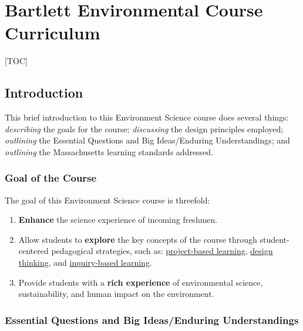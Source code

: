 \documentclass[
]{article}
\author{}
\date{\vspace{-2.5em}}
\providecommand{\tightlist}{%
  \setlength{\itemsep}{0pt}\setlength{\parskip}{0pt}}
\begin{document}
\hypertarget{bartlett-environmental-course-curriculum}{%
\section{\texorpdfstring{\textbf{Bartlett Environmental Course
Curriculum}}{Bartlett Environmental Course Curriculum}}\label{bartlett-environmental-course-curriculum}}

{[}TOC{]}

\hypertarget{introduction}{%
\subsection{Introduction}\label{introduction}}

This brief introduction to this Environment Science course does several
things: \emph{describing} the goals for the course; \emph{discussing}
the design principles employed; \emph{outlining} the Essential Questions
and Big Ideas/Enduring Understandings; and \emph{outlining} the
Massachusetts learning standards addressed.

\hypertarget{goal-of-the-course}{%
\subsubsection{Goal of the Course}\label{goal-of-the-course}}

The goal of this Environment Science course is threefold:

\begin{enumerate}
\def\labelenumi{\arabic{enumi}.}
\tightlist
\item
  \textbf{Enhance} the science experience of incoming freshmen.
\item
  Allow students to \textbf{explore} the key concepts of the course
  through student-centered pedagogical strategies, such as:
  \href{https://www.edutopia.org/project-based-learning}{project-based
  learning},
  \href{https://www.ideo.com/post/design-thinking-for-educators}{design
  thinking}, and
  \href{https://www.edutopia.org/blog/what-heck-inquiry-based-learning-heather-wolpert-gawron}{inquiry-based
  learning}.
\item
  Provide students with a \textbf{rich experience} of environmental
  science, sustainability, and human impact on the environment.
\end{enumerate}

\hypertarget{essential-questions-and-big-ideasenduring-understandings}{%
\subsubsection{Essential Questions and Big Ideas/Enduring
Understandings}\label{essential-questions-and-big-ideasenduring-understandings}}
\end{document}
